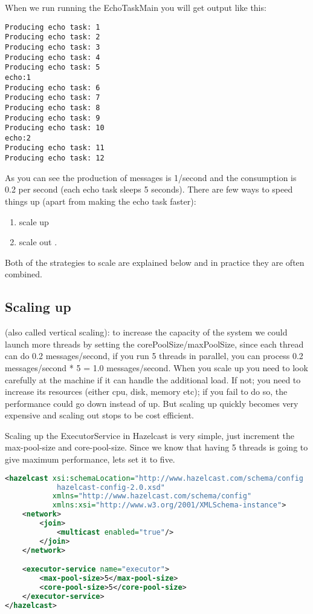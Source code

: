 When we run running the EchoTaskMain you will get output like this:
\begin{verbatim}
Producing echo task: 1
Producing echo task: 2
Producing echo task: 3
Producing echo task: 4
Producing echo task: 5
echo:1
Producing echo task: 6
Producing echo task: 7
Producing echo task: 8
Producing echo task: 9
Producing echo task: 10
echo:2
Producing echo task: 11
Producing echo task: 12	
\end{verbatim}
As you can see the production of messages is 1/second and the consumption is 0.2 per second (each echo task sleeps 5 seconds). There are few ways to speed things up (apart from making the echo task faster):
\begin{enumerate}
\item scale up 
\item scale out .
\end{enumerate}
Both of the strategies to scale are explained below and in practice they are often combined. 

\subsection{Scaling up}
(also called vertical scaling): to increase the capacity of the system we could launch more threads by setting the corePoolSize/maxPoolSize, since each thread can do 0.2 messages/second, if you run 5 threads in parallel, you can process 0.2 messages/second * 5 = 1.0 messages/second. When you scale up you need to look carefully at the machine if it can handle the additional load. If not; you need to increase its resources (either cpu, disk, memory etc); if you fail to do so, the performance could go down instead of up. But scaling up quickly becomes very expensive and scaling out stops to be cost efficient. 

Scaling up the ExecutorService in Hazelcast is very simple, just increment the max-pool-size and core-pool-size. Since we know that having 5 threads is going to give maximum performance, lets set it to five.
\begin{lstlisting}[language=xml]
<hazelcast xsi:schemaLocation="http://www.hazelcast.com/schema/config
            hazelcast-config-2.0.xsd"
           xmlns="http://www.hazelcast.com/schema/config"
           xmlns:xsi="http://www.w3.org/2001/XMLSchema-instance">
    <network>
        <join>
            <multicast enabled="true"/>
        </join>
    </network>

    <executor-service name="executor">
        <max-pool-size>5</max-pool-size>
        <core-pool-size>5</core-pool-size>
    </executor-service>
</hazelcast>
\end{lstlisting}

